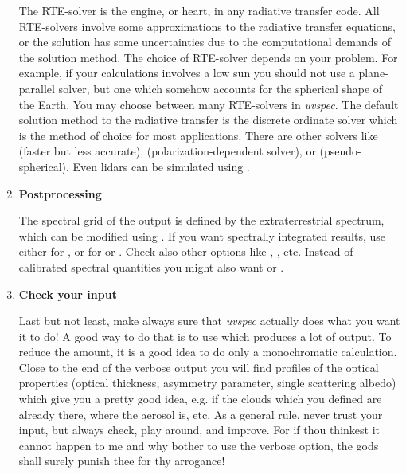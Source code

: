 \begin{enumerate}
  The RTE-solver is the engine, or heart, in any radiative transfer
  code. All RTE-solvers involve some approximations to the radiative
  transfer equations, or the solution has some uncertainties due to
  the computational demands of the solution method. The choice of
  RTE-solver depends on your problem. For example, if your
  calculations involves a low sun you should not use a plane-parallel
  solver, but one which somehow accounts for the spherical shape of
  the Earth. You may choose between many RTE-solvers in
  {\sl uvspec}. The default solution method to the radiative transfer
  is the discrete ordinate solver  which is the method
  of choice for most applications. There are other solvers like
   (faster but less accurate),
   (polarization-dependent solver), or
   (pseudo-spherical). Even
  lidars can be simulated using .
  
\item {\bf Postprocessing}
  
  The spectral grid of the output is defined by the extraterrestrial
  spectrum, which can be modified using .
  If you want spectrally integrated results, use either  
  for , or  for 
   or .
  Check also other options like , ,
  etc. Instead of calibrated spectral quantities you might also want
   or .
  
\item {\bf Check your input}
  
  Last but not least, make always sure that {\sl uvspec} actually
  does what you want it to do! A good way to do that is to use
   which produces a lot of output. To reduce the amount,
  it is a good idea to do only a monochromatic calculation. Close to the
  end of the verbose output you will find profiles of the optical
  properties (optical thickness, asymmetry parameter, single scattering
  albedo) which give you a pretty good idea, e.g. if the clouds which you
  defined are already there, where the aerosol is, etc. As a general
  rule, never trust your input, but always check, play around, and
  improve. For if thou thinkest it cannot happen to me and why bother to
  use the verbose option, the gods shall surely punish thee for thy
  arrogance!
  
\end{enumerate}

